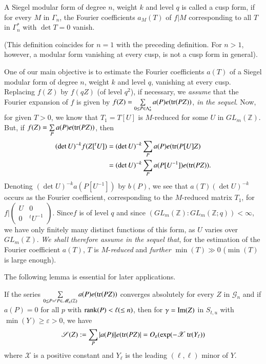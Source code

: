 \begin{defi*}
A Siegel modular form of degree $n$, weight $k$ and level $q$ is
called a cusp form, if for every $M$ in $\Gamma_{n}$, the Fourier
coefficients $a_{M}(T)$ of $f|M$ corresponding to all $T$ in
$\Gamma^{\ast}_{n}$ with $\det T=0$ vanish.
\end{defi*}
(This definition coincides for $n=1$ with the preceding
definition. For $n>1$, however, a modular form vanishing at every
cusp, is not a cusp form in general).

One of our main objective is to estimate the Fourier coefficients
$a(T)$ of a Siegel modular form of degree $n$, weight $k$ and level
$q$, vanishing at every cusp. Replacing $f(Z)$ by $f(qZ)$ (of level
$q^{2}$), if necessary, we {\em assume} that the Fourier expansion of
$f$ is given by $f(Z)=\sum\limits_{0\leq P\in
  \Lambda^{\ast}_{n}}a(P)e(\operatorname{tr}(PZ))$, {\em in the sequel}. Now, for
given $T>0$, we know that $T_{1}=T[U]$ is $M$-reduced for some $U$ in
$GL_{m}(\mathbb{Z})$. But, if $f(Z)=\sum\limits_{P}a(P)e(\operatorname{tr}(PZ))$,
then 
\begin{align*}
(\det U)^{-k}f(Z[{}^{t}U])&=(\det
U)^{-k}\sum\limits_{P}a(P)e(\operatorname{tr}(P[U]Z)\\
&=(\det
U)^{-k}\sum\limits_{P}a(P[U^{-1}])e(\operatorname{tr}(PZ)). 
\end{align*}
Denoting $(\det U)^{-k}a(P[U^{-1}])$ by $b(P)$, we see that $a(T)(\det
U)^{-k}$ occurs as the Fourier coefficient, corresponding to the
$M$-reduced matrix $T_{1}$, for $f|\left(\begin{smallmatrix} U & 0\\ 0
  & {}^{t}U^{-1}\end{smallmatrix}\right)$. Since\pageoriginale $f$ is
of level $q$ and since
$(GL_{m}(\mathbb{Z}):GL_{m}(\mathbb{Z};q))<\infty$, we have only
finitely many distinct functions of this form, as $U$ varies over
$GL_{m}(\mathbb{Z})$. {\em We shall therefore assume in the sequel
  that}, for the estimation of the Fourier coefficient $a(T)$, $T$ is
$M$-{\em reduced} and {\em further} $\min (T)\gg 0$ (\ie $\min(T)$ is
large enough).

The following lemma is essential for later applications.

\begin{sublemma}\label{c1:lem-1.4.1}
If the series $\sum\limits_{0\leq
  P={}^{t}P\in\mathscr{M}_{n}(\mathbb{Z})}a(P)e(\operatorname{tr}(PZ))$ converges
absolutely for every $Z$ in $\mathscr{G}_{n}$ and if $a(P)=0$ for all
$p$ with $\operatorname{rank}(P)<\ell(\leq n)$, then for $\gamma=\operatorname{Im} (Z)$ in
$S_{t,u}$ with $\min(Y)\geq \varepsilon>0$, we have
$$
\mathscr{S} (Z): = \sum\limits_{P} |a(P)||
e(\operatorname{tr}(PZ)|=O_{\varepsilon}(\exp(-\mathscr{X}\operatorname{tr}(Y_{\ell}))   
$$
where $\mathscr{X}$ is a positive constant and $Y_{\ell}$ is the
leading $(\ell,\ell)$ minor of $Y$.
\end{sublemma}

